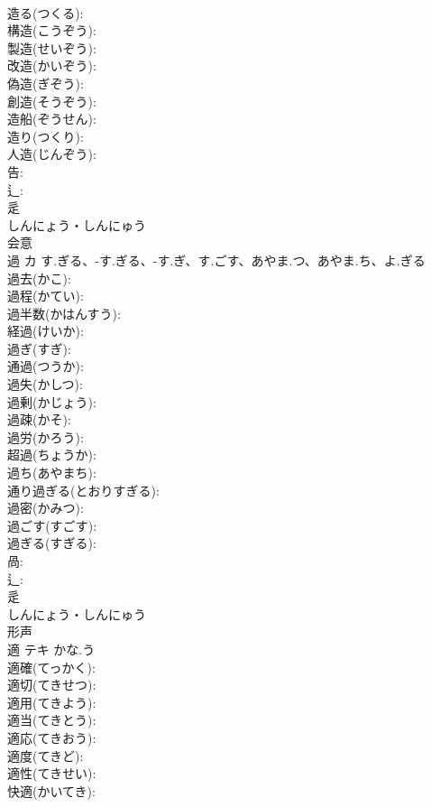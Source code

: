 \documentclass[8pt]{extreport}
\begin{document}
\begin{CJK}{UTF8}{min}
\\	造る(つくる): 
\\	構造(こうぞう): 
\\	製造(せいぞう): 
\\	改造(かいぞう): 
\\	偽造(ぎぞう): 
\\	創造(そうぞう): 
\\	造船(ぞうせん): 
\\	造り(つくり): 
\\	人造(じんぞう): 
\\	告: 
\\	辶: 
\\	辵	
\\	しんにょう・しんにゅう	
\\	会意 
\\	過	カ	す.ぎる、-す.ぎる、-す.ぎ、す.ごす、あやま.つ、あやま.ち、よ.ぎる		
\\	過去(かこ): 
\\	過程(かてい): 
\\	過半数(かはんすう): 
\\	経過(けいか): 
\\	過ぎ(すぎ): 
\\	通過(つうか): 
\\	過失(かしつ): 
\\	過剰(かじょう): 
\\	過疎(かそ): 
\\	過労(かろう): 
\\	超過(ちょうか): 
\\	過ち(あやまち): 
\\	通り過ぎる(とおりすぎる): 
\\	過密(かみつ): 
\\	過ごす(すごす): 
\\	過ぎる(すぎる): 
\\	咼: 
\\	辶: 
\\	辵	
\\	しんにょう・しんにゅう	
\\	形声 
\\	適	テキ	かな.う		
\\	適確(てっかく): 
\\	適切(てきせつ): 
\\	適用(てきよう): 
\\	適当(てきとう): 
\\	適応(てきおう): 
\\	適度(てきど): 
\\	適性(てきせい): 
\\	快適(かいてき): 

\end{CJK}
\end{document}
